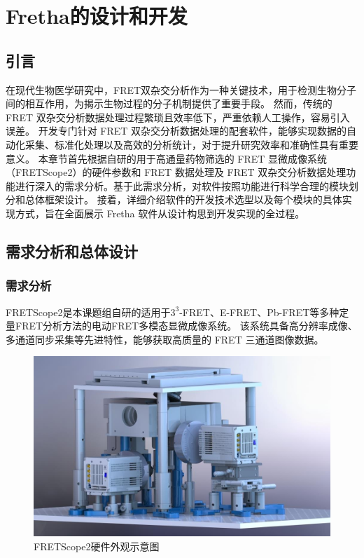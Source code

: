 \chapter{Fretha的设计和开发}

\section{引言}

\ifshowtext
在现代生物医学研究中，FRET双杂交分析作为一种关键技术，用于检测生物分子间的相互作用，为揭示生物过程的分子机制提供了重要手段。
然而，传统的 FRET 双杂交分析数据处理过程繁琐且效率低下，严重依赖人工操作，容易引入误差。
开发专门针对 FRET 双杂交分析数据处理的配套软件，能够实现数据的自动化采集、标准化处理以及高效的分析统计，对于提升研究效率和准确性具有重要意义。
本章节首先根据自研的用于高通量药物筛选的 FRET 显微成像系统（FRETScope2）的硬件参数和 FRET 数据处理及 FRET 双杂交分析数据处理功能进行深入的需求分析。基于此需求分析，对软件按照功能进行科学合理的模块划分和总体框架设计。
接着，详细介绍软件的开发技术选型以及每个模块的具体实现方式，旨在全面展示 Fretha 软件从设计构思到开发实现的全过程。
\fi

\section{需求分析和总体设计}

\subsection{需求分析}

\ifshowtext
FRETScope2是本课题组自研的适用于$3^3$-FRET、E-FRET、Pb-FRET等多种定量FRET分析方法的电动FRET多模态显微成像系统。
该系统具备高分辨率成像、多通道同步采集等先进特性，能够获取高质量的 FRET 三通道图像数据。
\begin{figure}[hbtp]
  \centering
  \includegraphics[width=0.9\linewidth]{../figures/2/2_FRETScope2示意图.jpg}
  \caption{FRETScope2硬件外观示意图}
  \label{fig:fretscope2硬件示意图}
\end{figure}

